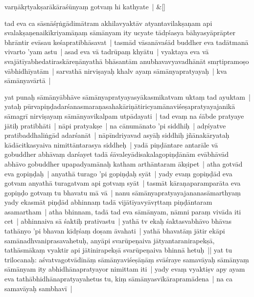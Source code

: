 \documentclass[article,12pt,a4paper]{memoir}%
\newcommand{\persName}[1]{#1}
\newcounter{parCount}
\begin{document}
	    
	    \stanza[\smallbreak]
	  varṇākṛtyakṣarākāraśūnyaṃ gotvaṃ hi kathyate | \&[\smallbreak]
	  
	  
	  

	  \pstart \leavevmode%
	\label{thakur75-63.14}tad eva ca sāsnāśṛṅgādimātram akhilavyaktāv atyantavilakṣaṇam api svalakṣaṇenaikīkriyamāṇaṃ sāmānyam ity ucyate tādṛśasya bāhyasyāprāpter bhrāntir evāsau keśapratibhāsavat | tasmād vāsanāvaśād buddher eva tadātmanā vivarto 'yam astu | asad eva vā tadrūpaṃ khyātu | vyaktaya eva vā svajātīyabhedatiraskāreṇānyathā bhāsantām anubhavavyavadhānāt smṛtipramoṣo vābhidhīyatām | sarvathā nirviṣayaḥ khalv ayaṃ sāmānyapratyayaḥ | kva sāmānyavārtā | 
	{}
	\pend%
      

	  \pstart \leavevmode%
	\label{thakur75-63.21}yat punaḥ sāmānyābhāve sāmānyapratyayasyākasmikatvam uktaṃ tad ayuktam | yataḥ pūrvapiṇḍadarśanasmaraṇasahakāriṇātiricyamānaviśeṣapratyayajanikā sāmagrī nirviṣayaṃ sāmānyavikalpam utpādayati | tad evaṃ na śābde pratyaye jātiḥ pratibhāti | nāpi pratyakṣe | na cānumānato 'pi siddhiḥ | adṛśyatve pratibaddhaliṅgād adarśanāt | nāpīndriyavad asyāḥ siddhiḥ jñānakāryataḥ kādācitkasyaiva nimittāntarasya siddheḥ | yadā piṇḍāntare antarāle vā gobuddher abhāvaṃ darśayet tadā śāvaleyādisakalagopiṇḍānām evābhāvād abhāvo gobuddher upapadyamānaḥ katham arthāntaram ākṣipet | atha gotvād eva gopiṇḍaḥ | anyathā turago 'pi gopiṇḍaḥ syāt | yady evaṃ gopiṇḍād eva gotvam anyathā turagatvam api gotvaṃ syāt | tasmāt kāraṇaparamparāta eva gopiṇḍo gotvaṃ tu bhavatu mā vā | nanu sāmānyapratyayajananasāmarthyaṃ yady ekasmāt piṇḍād abhinnaṃ tadā vijātīyavyāvṛttaṃ piṇḍāntaram asamartham | atha bhinnam, tadā tad eva sāmānyam, nāmni paraṃ vivāda iti cet | abhinnaiva sā śaktiḥ prativastu | yathā tv ekaḥ śaktasvabhāvo bhāvas tathānyo 'pi bhavan kīdṛśaṃ doṣam āvahati | yathā bhavatāṃ jātir ekāpi samānadhvaniprasavahetuḥ, anyāpi svarūpeṇaiva jātyantaranirapekṣā, tathāsmākaṃ vyaktir api jātinirapekṣā svarūpeṇaiva bhinnā hetuḥ || \label{thakur75-64.7} yat tu \persName{trilocanaḥ}: aśvatvagotvādīnāṃ sāmānyaviśeṣāṇāṃ svāśraye samavāyaḥ sāmānyaṃ sāmānyam ity abhidhānapratyayor nimittam iti | yady evaṃ vyaktiṣv apy ayam eva tathābhidhānapratyayahetus tu, kiṃ sāmānyasvīkārapramādena | na ca samavāyaḥ sambhavī |
	{}
	\pend%
      
\end{document}

